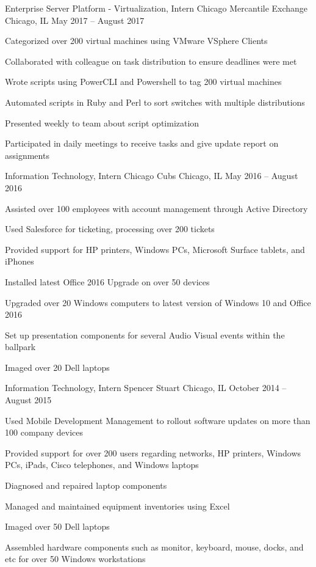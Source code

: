 \documentclass[]{awesome-cv}
\begin{document}
\vspace{-2mm}
\begin{cventries}
	\cventry
	{Enterprise Server Platform - Virtualization, Intern}
	{Chicago Mercantile Exchange}
	{Chicago, IL}
	{May 2017 – August 2017}
	{\begin{cvitems}
		\item {Categorized over 200 virtual machines using VMware VSphere Clients}
		\item {Collaborated with colleague on task distribution to ensure deadlines were met}
		\item {Wrote scripts using PowerCLI and Powershell to tag 200 virtual machines}
		\item {Automated scripts in Ruby and Perl to sort switches with multiple distributions}
		\item {Presented weekly to team about script optimization}
		\item {Participated in daily meetings to receive tasks and give update report on assignments}
		\end{cvitems}}
	\cventry
	{Information Technology, Intern}
	{Chicago Cubs}
	{Chicago, IL}
	{May 2016 – August 2016}
	{\begin{cvitems}
		\item {Assisted over 100 employees with account management through Active Directory}
		\item {Used Salesforce for ticketing, processing over 200 tickets}
		\item {Provided support for HP printers, Windows PCs, Microsoft Surface tablets, and iPhones}
		\item {Installed latest Office 2016 Upgrade on over 50 devices}
		\item {Upgraded over 20 Windows computers to latest version of Windows 10 and Office 2016}
		\item {Set up presentation components for several Audio Visual events within the ballpark}
		\item {Imaged over 20 Dell laptops}
		\end{cvitems}}
	\cventry
	{Information Technology, Intern}
	{Spencer Stuart}
	{Chicago, IL}
	{October 2014 – August 2015}
	{\begin{cvitems}
		\item {Used Mobile Development Management to rollout software updates on more than 100 company devices}
		\item {Provided support for over 200 users regarding networks, HP printers, Windows PCs, iPads, Cisco telephones, and Windows laptops}
		\item {Diagnosed and repaired laptop components}
		\item {Managed and maintained equipment inventories using Excel}
		\item {Imaged over 50 Dell laptops}
		\item {Assembled hardware components such as monitor, keyboard, mouse, docks, and etc for over 50 Windows workstations}
		\end{cvitems}}
\end{cventries}
\end{document}
